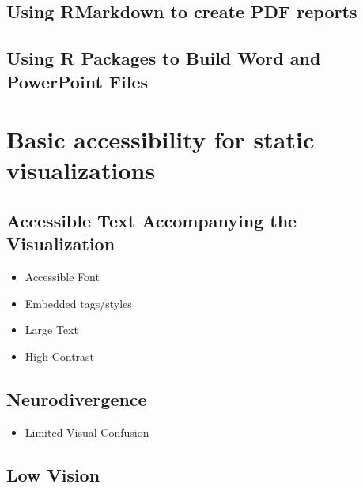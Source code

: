 \documentclass[
]{krantz}
\providecommand{\tightlist}{%
  \setlength{\itemsep}{0pt}\setlength{\parskip}{0pt}}
\begin{document}
\hypertarget{using-rmarkdown-to-create-pdf-reports}{%
\section{Using RMarkdown to create PDF reports}\label{using-rmarkdown-to-create-pdf-reports}}

\hypertarget{using-r-packages-to-build-word-and-powerpoint-files}{%
\section{Using R Packages to Build Word and PowerPoint Files}\label{using-r-packages-to-build-word-and-powerpoint-files}}

\hypertarget{accessibility-for-visualizations}{%
\chapter{Basic accessibility for static visualizations}\label{accessibility-for-visualizations}}

\hypertarget{accessible-text-accompanying-the-visualization}{%
\section{Accessible Text Accompanying the Visualization}\label{accessible-text-accompanying-the-visualization}}

\begin{itemize}
\tightlist
\item
  Accessible Font
\item
  Embedded tags/styles
\item
  Large Text
\item
  High Contrast
\end{itemize}

\hypertarget{neurodivergence}{%
\section{Neurodivergence}\label{neurodivergence}}

\begin{itemize}
\tightlist
\item
  Limited Visual Confusion
\end{itemize}

\hypertarget{low-vision}{%
\section{Low Vision}\label{low-vision}}
\end{document}
